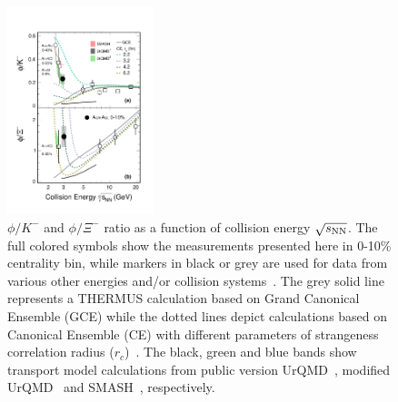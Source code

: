 \documentclass[%
 reprint,	
showpacs,
 amsmath,amssymb,
 aps,
 prc,
]{revtex4-1}
\begin{document}
\begin{figure}
\centering
\hspace*{-4mm}
\includegraphics[width=0.38\textwidth]{fig/fig4_phi_over_kminus_zoomin.eps}
  \caption{ $\phi/K^-$ and $\phi/\Xi^-$ ratio as a function of collision energy $\sqrt{s_{\rm NN}}$. The full colored symbols show the measurements presented here in 0-10\% centrality bin, while markers in black or grey are used for data from various other energies and/or collision systems~\cite{E917_phi,NA49_phi,FOPI_phi_AlAl,FOPI_phi_NiNi,HADES_phi_ArKCl,HADES_phi_AuAu,Xi_ArKCl_HADES,star_bes_strangeness}. The grey solid line represents a THERMUS calculation based on Grand Canonical Ensemble (GCE) while the dotted lines depict calculations based on Canonical Ensemble (CE) with different parameters of strangeness correlation radius ($r_c$)~\cite{THERMUS_WHEATON200984,Andronic_2018Naure}. The black, green and blue bands show transport model calculations from public version UrQMD~\cite{urQMD,UrQMD_2}, modified UrQMD~\cite{Steinheimer_2015_UrQMD} and SMASH~\cite{Elfner_SMASH}, respectively.}
\label{fig:phi2Kratio} 
\end{figure}
\end{document}
